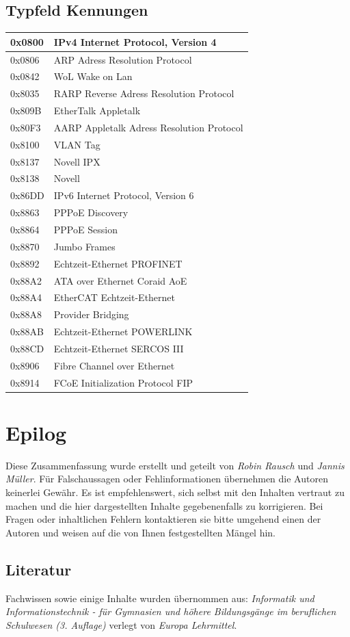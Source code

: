 \documentclass[12pt,a4paper]{article}
\begin{document}
\subsection{Typfeld Kennungen}
    \renewcommand{\arraystretch}{2}
    \begin{tabularx}{17cm}{|l|X|}
        \hline
        0x0800&IPv4 Internet Protocol, Version 4\\
        \hline
        0x0806&ARP Adress Resolution Protocol\\
        \hline
        0x0842&WoL Wake on Lan\\
        \hline
        0x8035&RARP Reverse Adress Resolution Protocol\\
        \hline
        0x809B&EtherTalk Appletalk\\
        \hline
        0x80F3&AARP Appletalk Adress Resolution Protocol\\
        \hline
        0x8100&VLAN Tag\\
        \hline
        0x8137&Novell IPX\\
        \hline
        0x8138&Novell\\
        \hline
        0x86DD&IPv6 Internet Protocol, Version 6\\
        \hline
        0x8863&PPPoE Discovery\\
        \hline
        0x8864&PPPoE Session\\
        \hline
        0x8870&Jumbo Frames\\
        \hline
        0x8892&Echtzeit-Ethernet PROFINET\\
        \hline
        0x88A2&ATA over Ethernet Coraid AoE\\
        \hline
        0x88A4&EtherCAT Echtzeit-Ethernet\\
        \hline
        0x88A8&Provider Bridging\\
        \hline
        0x88AB&Echtzeit-Ethernet POWERLINK\\
        \hline
        0x88CD&Echtzeit-Ethernet SERCOS III\\
        \hline
        0x8906&Fibre Channel over Ethernet\\
        \hline
        0x8914&FCoE Initialization Protocol FIP\\
        \hline
    \end{tabularx}

\section{Epilog}
    \noindent
    Diese Zusammenfassung wurde erstellt und geteilt von \textit{Robin Rausch} und \textit{Jannis Müller}. Für Falschaussagen oder Fehlinformationen übernehmen die Autoren keinerlei Gewähr. Es ist empfehlenswert, sich selbst mit den Inhalten vertraut zu machen und die hier dargestellten Inhalte gegebenenfalls zu korrigieren. Bei Fragen oder inhaltlichen Fehlern kontaktieren sie bitte umgehend einen der Autoren und weisen auf die von Ihnen festgestellten Mängel hin. 
    
\subsection{Literatur}
    Fachwissen sowie einige Inhalte wurden übernommen aus:\newline
    \textit{Informatik und Informationstechnik - für Gymnasien und höhere Bildungsgänge im beruflichen Schulwesen (3. Auflage)} verlegt von \textit{Europa Lehrmittel}. 
\end{document}

